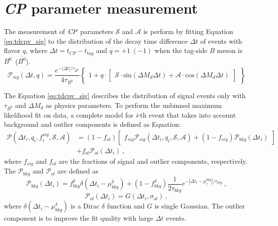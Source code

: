\chapter{\textit{CP} parameter measurement}

The measurement of $\it{CP}$ parameters $\mathcal{S}$ and $\mathcal{A}$ is perform by fitting  Equation \ref{eq:tdcpv_sig} to the distribution of the decay time difference $\Delta t$ of events with flavor $q$, where $\Delta t = t_{CP}-t_{tag}$ and $q =  +1~(-1)$ when the tag-side $B$ meson is $B^0$~($\bar{B^0}$). 
\begin{equation}\label{eq:tdcpv_sig}
\mathcal{P}_{sig}(\Delta t, q ) = 
\frac{e^{-|\Delta t|/\tau_{B^0}}}{4\tau_{B^0}}
\begin{Bmatrix}
1 + q \cdot 
\begin{bmatrix}
\mathcal{S}\cdot\text{sin}(\Delta M_d \Delta t) + 
\mathcal{A}\cdot\text{cos}(\Delta M_d \Delta t)
\end{bmatrix}
\end{Bmatrix}
\end{equation}

The Equation \ref{eq:tdcpv_sig} describes the distribution of signal events only with $\tau_{B^0}$ and $\Delta M_d$ as physics parameters. To perform the unbinned maximum likelihood fit on data, a complete model for \textit{i}-th event that takes into account background and outlier components is defined as Equation:
\begin{equation}\label{eq:tdcpv_all}
\begin{split}
\mathcal{P}(\Delta t_i,q_i,f_i^{sig},\mathcal{S},\mathcal{A})
&=(1-f_{ol})\begin{bmatrix}f_{sig}\mathcal{P}_{sig}(\Delta t_i,q_i,\mathcal{S},\mathcal{A})+(1-f_{sig})\mathcal{P}_{bkg}(\Delta t_i)
\end{bmatrix}\\
&+f_{ol}\mathcal{P}_{ol}(\Delta t_i)~,
\end{split}
\end{equation}
where $f_{sig}$ and $f_{ol}$ are the fractions of signal and outlier components, respectively. The $\mathcal{P}_{bkg}$ and $\mathcal{P}_{ol}$ are defined as
\begin{equation}\label{eq:p_bkg}
\mathcal{P}_{bkg} (\Delta t_i)=
f_{bkg}^{\delta}\delta(\Delta t_i-\mu_{bkg}^{\delta})+(1-f_{bkg}^{\delta})
\frac{1}{2\tau_{bkg}}e^{-|\Delta t_i-\mu_{\tau}^{bkg}|/\tau_{bkg}}~,
\end{equation}
\begin{equation}\label{eq:p_out}
\mathcal{P}_{ol} (\Delta t_i)=
G(\Delta t_i, \sigma_{ol})~,
\end{equation}
where $\delta(\Delta t_i-\mu_{bkg}^{\delta})$ is a Dirac $\delta$ function and $G$ is single Gaussian. The outlier component is to improve the fit quality with large $\Delta t$ events.

